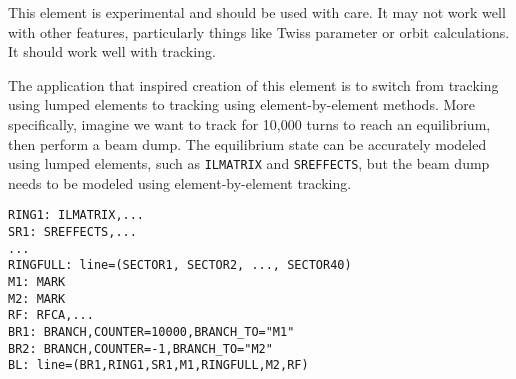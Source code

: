 This element is experimental and should be used with care.
It may not work well with other features, particularly things like Twiss parameter or orbit calculations.
It should work well with tracking.

The application that inspired creation of this element is to switch from tracking using lumped elements to tracking
using element-by-element methods.
More specifically, imagine we want to track for 10,000 turns to reach an equilibrium, then perform a beam dump.
The equilibrium state can be accurately modeled using lumped elements, such as \verb|ILMATRIX| and \verb|SREFFECTS|,
but the beam dump needs to be modeled using element-by-element tracking.
\begin{verbatim}
RING1: ILMATRIX,...
SR1: SREFFECTS,...
...
RINGFULL: line=(SECTOR1, SECTOR2, ..., SECTOR40)
M1: MARK
M2: MARK
RF: RFCA,...
BR1: BRANCH,COUNTER=10000,BRANCH_TO="M1"
BR2: BRANCH,COUNTER=-1,BRANCH_TO="M2"
BL: line=(BR1,RING1,SR1,M1,RINGFULL,M2,RF)
\end{verbatim}
